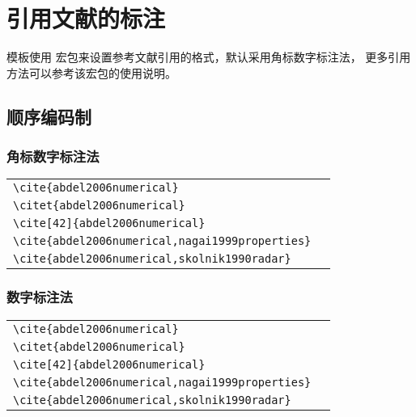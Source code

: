 
\chapter{引用文献的标注}

模板使用  宏包来设置参考文献引用的格式，默认采用角标数字标注法，
更多引用方法可以参考该宏包的使用说明。

\section{顺序编码制}

\subsection{角标数字标注法}

\noindent
\begin{tabular}{l@{\quad$\Rightarrow$\quad}l}
  \verb|\cite{abdel2006numerical}|                      & \cite{abdel2006numerical}         \\
  \verb|\citet{abdel2006numerical}|                     & \citet{abdel2006numerical}        \\
  \verb|\cite[42]{abdel2006numerical}|                  & \cite[42]{abdel2006numerical}     \\
  \verb|\cite{abdel2006numerical,nagai1999properties}|  & \cite{abdel2006numerical,nagai1999properties}    \\
  \verb|\cite{abdel2006numerical,skolnik1990radar}|     & \cite{abdel2006numerical,skolnik1990radar} \\
\end{tabular}


\subsection{数字标注法}

\noindent
\begin{tabular}{l@{\quad$\Rightarrow$\quad}l}
  \verb|\cite{abdel2006numerical}|         & \cite{abdel2006numerical}         \\
  \verb|\citet{abdel2006numerical}|        & \citet{abdel2006numerical}        \\
  \verb|\cite[42]{abdel2006numerical}|     & \cite[42]{abdel2006numerical}     \\
  \verb|\cite{abdel2006numerical,nagai1999properties}|    & \cite{abdel2006numerical,nagai1999properties}    \\
  \verb|\cite{abdel2006numerical,skolnik1990radar}| & \cite{abdel2006numerical,skolnik1990radar} \\
\end{tabular}


\nocite{*}
